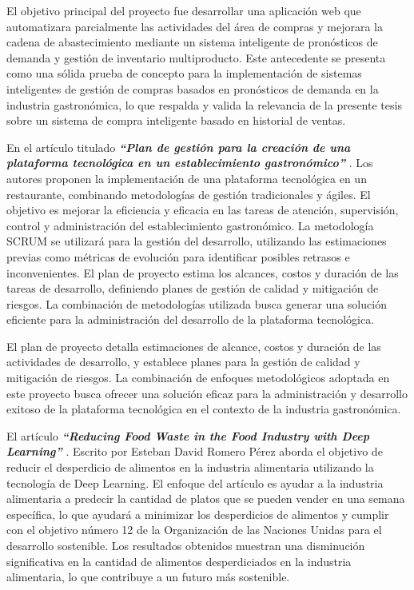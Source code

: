 \vspace{1\baselineskip}
El objetivo principal del proyecto fue desarrollar una aplicación web que automatizara parcialmente las actividades del área de compras y mejorara la cadena de abastecimiento mediante un sistema inteligente de pronósticos de demanda y gestión de inventario multiproducto. 
Este antecedente se presenta como una sólida prueba de concepto para la implementación de sistemas inteligentes de gestión de compras basados en pronósticos de demanda en la industria gastronómica, lo que respalda y valida la relevancia de la presente tesis sobre un sistema de compra inteligente basado en historial de ventas.

\vspace{1\baselineskip}
En el artículo titulado  \textbf{\textit{“Plan de gestión para la creación de una plataforma tecnológica en un establecimiento gastronómico” }}\cite{sanchez2018sistemas}. Los autores proponen la implementación de una plataforma tecnológica en un restaurante, combinando metodologías de gestión tradicionales y ágiles. El objetivo es mejorar la eficiencia y eficacia en las tareas de atención, supervisión, control y administración del establecimiento gastronómico. La metodología SCRUM se utilizará para la gestión del desarrollo, utilizando las estimaciones previas como métricas de evolución para identificar posibles retrasos e inconvenientes. El plan de proyecto estima los alcances, costos y duración de las tareas de desarrollo, definiendo planes de gestión de calidad y mitigación de riesgos. La combinación de metodologías utilizada busca generar una solución eficiente para la administración del desarrollo de la plataforma tecnológica. 

\vspace{1\baselineskip}
El plan de proyecto detalla estimaciones de alcance, costos y duración de las actividades de desarrollo, y establece planes para la gestión de calidad y mitigación de riesgos. La combinación de enfoques metodológicos adoptada en este proyecto busca ofrecer una solución eficaz para la administración y desarrollo exitoso de la plataforma tecnológica en el contexto de la industria gastronómica.

\vspace{1\baselineskip}
El artículo \textbf{\textit{ “Reducing Food Waste in the Food Industry with Deep Learning” }}\cite{afanador2022diseno}. Escrito por Esteban David Romero Pérez aborda el objetivo de reducir el desperdicio de alimentos en la industria alimentaria utilizando la tecnología de Deep Learning. El enfoque del artículo es ayudar a la industria alimentaria a predecir la cantidad de platos que se pueden vender en una semana específica, lo que ayudará a minimizar los desperdicios de alimentos y cumplir con el objetivo número 12 de la Organización de las Naciones Unidas para el desarrollo sostenible. Los resultados obtenidos muestran una disminución significativa en la cantidad de alimentos desperdiciados en la industria alimentaria, lo que contribuye a un futuro más sostenible.

